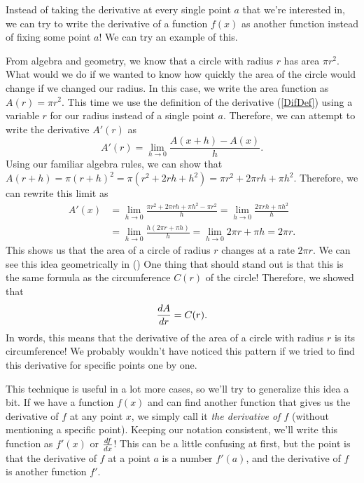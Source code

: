 
Instead of taking the derivative at every single point $a$ that we're interested in, we can try to write the derivative of a function $f(x)$ as another function instead of fixing some point $a$! We can try an example of this.

\begin{exmp}
  From algebra and geometry, we know that a circle with radius $r$ has area $\pi r^2$. What would we do if we wanted to know how quickly the area of the circle would change if we changed our radius. In this case, we write the area function as $A(r) =  \pi r^2$. This time we use the definition of the derivative (\cref{DifDef}) using a variable $r$ for our radius instead of a single point $a$. Therefore, we can attempt to write the derivative $A'(r)$ as
  \[
  A'(r) = \lim\limits_{h\to 0}\frac{A(x+h)-A(x)}{h}.
  \]
  Using our familiar algebra rules, we can show that $A(r+h) = \pi(r+h)^2 = \pi(r^2 + 2rh + h^2) = \pi r^2 + 2\pi rh + \pi h^2$. Therefore, we can rewrite this limit as
  \begin{align}
  A'(x) & = \lim\limits_{h\to 0}\frac{\pi r^2 + 2\pi rh + \pi h^2 - \pi r^2}{h} =  \lim\limits_{h\to 0}\frac{2\pi rh + \pi h^2}{h}\\
  & = \lim\limits_{h\to 0}\frac{h(2\pi r + \pi h)}{h} = \lim\limits_{h\to 0} 2\pi r + \pi h = 2\pi r.
  \end{align} This shows us that the area of a circle of radius $r$ changes at a rate $2\pi r$. We can see this idea geometrically in ()  One thing that should stand out is that this is the same formula as the circumference $C(r)$ of the circle! Therefore, we showed that
  \[
  \frac{d A}{d r} = C(r).
  \]  In words, this means that the derivative of the area of a circle with radius $r$ is its circumference! We probably wouldn't have noticed this pattern if we tried to find this derivative for specific points one by one.
\end{exmp}



This technique is useful in a lot more cases, so we'll try to generalize this idea a bit. If we have a function $f(x)$ and can find another function that gives us the derivative of $f$ at any point $x$, we simply call it \emph{the derivative of $f$} (without mentioning a specific point). Keeping our notation consistent, we'll write this function as $f'(x)$ or $\frac{d f}{d x}$! This can be a little confusing at first, but the point is that the derivative of $f$ at a point $a$ is a number $f'(a)$, and the derivative of $f$ is another function $f'$.

